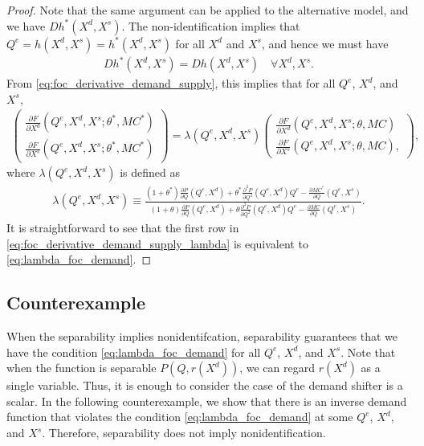 \documentclass[11pt, a4paper]{article}
\theoremstyle{remark}
\begin{document}
\begin{proof}
Note that the same argument can be applied to the alternative model, and we have $Dh^{*}(X^{d}, X^{s})$.
The non-identification implies that $Q^e = h(X^{d}, X^{s}) = h^{*}(X^{d}, X^{s})$ for all $X^{d}$ and $X^{s}$, and hence we must have
\begin{align}
    Dh^{*}(X^{d}, X^{s}) = Dh(X^{d}, X^{s}) \quad \forall X^{d}, X^{s}. \label{eq:observale_equivalence_derivative}
\end{align}
From \eqref{eq:foc_derivative_demand_supply}, this implies that for all $Q^e$, $X^{d}$, and $X^{s}$,
\begin{align}
    \begin{pmatrix}
        \frac{\partial F}{\partial X^{d}}(Q^e, X^{d}, X^{s}; \theta^{*}, MC^{*})\\
        \frac{\partial F}{\partial X^{s}}(Q^e, X^{d}, X^{s}; \theta^{*}, MC^{*})
    \end{pmatrix}
    = \lambda(Q^e, X^{d}, X^{s})
    \begin{pmatrix}
        \frac{\partial F}{\partial X^{d}}(Q^e, X^{d}, X^{s}; \theta, MC)\\
        \frac{\partial F}{\partial X^{s}}(Q^e, X^{d}, X^{s}; \theta, MC),
    \end{pmatrix},\label{eq:foc_derivative_demand_supply_lambda}
\end{align}
where $\lambda(Q^e, X^{d}, X^{s})$ is defined as
\begin{align}
    \lambda(Q^e, X^{d}, X^{s}) \equiv \frac{(1+\theta^{*})\frac{\partial P}{\partial Q}(Q^e, X^{d}) + \theta^{*}\frac{\partial^2 P}{\partial Q^2}(Q^e, X^{d})Q^e - \frac{\partial MC^{*}}{\partial Q}(Q^e, X^{s})}{(1+\theta)\frac{\partial P}{\partial Q}(Q^e, X^{d}) + \theta\frac{\partial^2 P}{\partial Q^2}(Q^e, X^{d})Q^e - \frac{\partial MC}{\partial Q}(Q^e, X^{s})}. \label{eq:lambda_foc}
\end{align}
It is straightforward to see that the first row in \eqref{eq:foc_derivative_demand_supply_lambda} is equivalent to \eqref{eq:lambda_foc_demand}.
\end{proof}

\subsection{Counterexample}

When the separability implies nonidentifcation, separability guarantees that we have the condition \eqref{eq:lambda_foc_demand} for all $Q^e$, $X^{d}$, and $X^{s}$.
Note that when the function is separable $P(Q, r(X^{d}))$, we can regard $r(X^{d})$ as a single variable.
Thus, it is enough to consider the case of the demand shifter is a scalar.
In the following counterexample, we show that there is an inverse demand function that violates the condition \eqref{eq:lambda_foc_demand} at some $Q^e$, $X^{d}$, and $X^{s}$.
Therefore, separability does not imply nonidentification.
\end{document}
